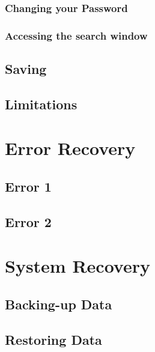 \pagebreak
\subsubsection{Changing your Password}
\label{fig:Changing your Password}


\pagebreak
\subsubsection{Accessing the search window}
\label{fig:Accessing the search window}




\subsection{Saving}

\subsection{Limitations}

\section{Error Recovery}

\subsection{Error 1}

\subsection{Error 2}

\section{System Recovery}

\subsection{Backing-up Data}

\subsection{Restoring Data}